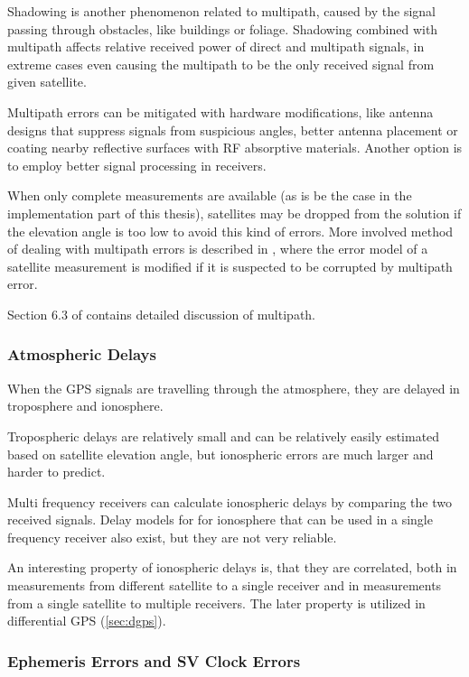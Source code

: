 Shadowing is another phenomenon related to multipath, caused by the signal passing through obstacles, like buildings or foliage.
Shadowing combined with multipath affects relative received power of direct and multipath signals, in extreme cases
even causing the multipath to be the only received signal from given satellite.

Multipath errors can be mitigated with hardware modifications, like antenna designs that suppress signals from suspicious angles,
better antenna placement or coating nearby reflective surfaces with RF absorptive materials.
Another option is to employ better signal processing in receivers.

When only complete measurements are available (as is be the case in the implementation part of this thesis),
satellites may be dropped from the solution if the elevation angle
is too low to avoid this kind of errors.
More involved method of dealing with multipath errors is described in \cite{viandier08},
where the error model of a satellite measurement is modified if it is suspected to be corrupted
by multipath error.

Section 6.3 of \cite{kaplan06} contains detailed discussion of multipath.

\subsubsection{Atmospheric Delays}

When the GPS signals are travelling through the atmosphere, they are delayed in troposphere and ionosphere.

Tropospheric delays are relatively small and can be relatively easily estimated based on satellite elevation
angle, but ionospheric errors are much larger and harder to predict.

Multi frequency receivers can calculate ionospheric delays by comparing the two received signals.
Delay models for for ionosphere that can be used in a single frequency receiver also exist,
but they are not very reliable.

An interesting property of ionospheric delays is, that they are correlated,
both in measurements from different satellite to a single receiver and in measurements
from a single satellite to multiple receivers.
The later property is utilized in differential GPS (\autoref{sec:dgps}).


\subsubsection{Ephemeris Errors and SV Clock Errors}

